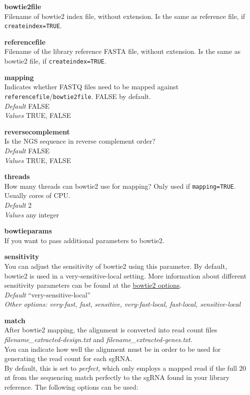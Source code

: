 \documentclass[]{article}
\begin{document}
\textbf{bowtie2file}\\
Filename of bowtie2 index file, without extension. Is the same as
reference file, if \texttt{createindex=TRUE}.

\textbf{referencefile}\\
Filename of the library reference FASTA file, without extension. Is the
same as bowtie2 file, if \texttt{createindex=TRUE}.

\textbf{mapping}\\
Indicates whether FASTQ files need to be mapped against
\texttt{referencefile}/\texttt{bowtie2file}. FALSE by default.\\
\emph{Default} FALSE\\
\emph{Values} TRUE, FALSE

\textbf{reversecomplement}\\
Is the NGS sequence in reverse complement order?\\
\emph{Default} FALSE\\
\emph{Values} TRUE, FALSE

\textbf{threads}\\
How many threads can bowtie2 use for mapping? Only used if
\texttt{mapping=TRUE}. Usually cores of CPU.\\
\emph{Default} 2\\
\emph{Values} any integer

\textbf{bowtieparams}\\
If you want to pass additional parameters to bowtie2.

\textbf{sensitivity}\\
You can adjust the sensitivity of bowtie2 using this parameter. By
default, bowtie2 is used in a very-sensitive-local setting. More
information about different sensitivity parameters can be found at the
\href{http://bowtie-bio.sourceforge.net/bowtie2/manual.shtml\#options}{bowtie2
options}.\\
\emph{Default} ``very-sensitive-local''\\
\emph{Other options: very-fast, fast, sensitive, very-fast-local,
fast-local, sensitive-local}

\textbf{match}\\
After bowtie2 mapping, the alignment is converted into read count files
\emph{filename\_extracted-design.txt} and
\emph{filename\_extracted-genes.txt}.\\
You can indicate how well the alignment must be in order to be used for
generating the read count for each sgRNA.\\
By default, this is set to \emph{perfect}, which only employs a mapped
read if the full 20 nt from the sequencing match perfectly to the sgRNA
found in your library reference. The following options can be used:
\end{document}
